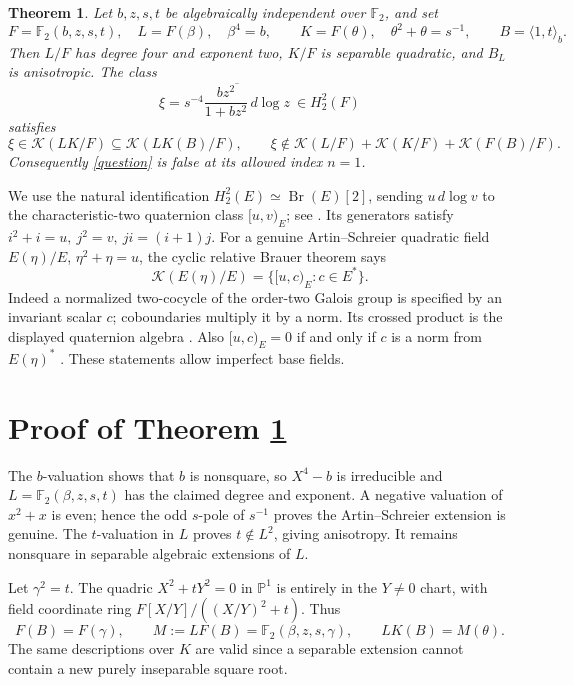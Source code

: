 \documentclass[11pt]{article}
\newtheorem{theorem}{Theorem}
\newcommand{\F}{\mathbb F}
\newcommand{\K}{\mathcal K}
\newcommand{\Br}{\operatorname{Br}}
\begin{document}
\begin{theorem}\label{main}
Let \(b,z,s,t\) be algebraically independent over \(\F_2\), and set
\[
 F=\F_2(b,z,s,t),\quad L=F(\beta),\quad\beta^4=b,\qquad
 K=F(\theta),\quad\theta^2+\theta=s^{-1},\qquad
 B=\langle1,t\rangle_b .
\]
Then \(L/F\) has degree four and exponent two, \(K/F\) is separable
quadratic, and \(B_L\) is anisotropic. The class
\[
 \xi=\overline{s^{-4}\frac{bz^2}{1+bz^2}\,d\log z}\ \in H_2^2(F)
\]
satisfies
\[
 \xi\in\K(LK/F)\subseteq\K(LK(B)/F),\qquad
 \xi\notin\K(L/F)+\K(K/F)+\K(F(B)/F).
\]
Consequently \eqref{question} is false at its allowed index \(n=1\).
\end{theorem}

We use the natural identification \(H_2^2(E)\simeq\Br(E)[2]\),
sending \(u\,d\log v\) to the characteristic-two quaternion class
\([u,v)_E\); see \cite[pp.~2--3]{CQM}.
Its generators satisfy \(i^2+i=u,\ j^2=v,\ ji=(i+1)j\).
For a genuine Artin--Schreier quadratic field \(E(\eta)/E\),
\(\eta^2+\eta=u\), the cyclic relative Brauer theorem says
\[
 \K(E(\eta)/E)=\{[u,c)_E:c\in E^*\}.
\]
Indeed a normalized two-cocycle of the order-two Galois group is
specified by an invariant scalar \(c\); coboundaries multiply it by a
norm. Its crossed product is the displayed quaternion algebra
\cite[IV, \S3, items~3.11--3.14]{Milne}.
Also \([u,c)_E=0\) if and only if \(c\) is a norm from \(E(\eta)^*\)
\cite[Theorem~6.4.11]{Voight}.
These statements allow imperfect base fields.

\section{Proof of Theorem \ref{main}}
The \(b\)-valuation shows that \(b\) is nonsquare, so \(X^4-b\)
is irreducible and \(L=\F_2(\beta,z,s,t)\) has the claimed degree and
exponent. A negative valuation of \(x^2+x\) is even; hence the odd
\(s\)-pole of \(s^{-1}\) proves the Artin--Schreier extension is genuine.
The \(t\)-valuation in \(L\) proves \(t\notin L^2\), giving anisotropy.
It remains nonsquare in separable algebraic extensions of \(L\).

Let \(\gamma^2=t\). The quadric \(X^2+tY^2=0\) in \(\mathbb P^1\)
is entirely in the \(Y\ne0\) chart, with field coordinate ring
\(F[X/Y]/((X/Y)^2+t)\). Thus
\[
 F(B)=F(\gamma),\qquad
 M:=LF(B)=\F_2(\beta,z,s,\gamma),\qquad LK(B)=M(\theta).
\]
The same descriptions over \(K\) are valid since a separable
extension cannot contain a new purely inseparable square root.
\end{document}
